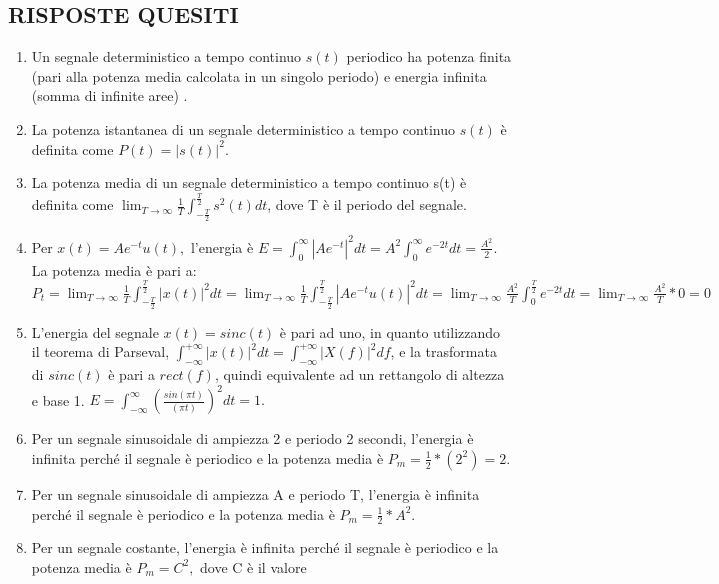 \documentclass[12pt
]{article}
\begin{document}
\hypertarget{risposte-quesiti}{%
	\subsection{RISPOSTE QUESITI}\label{risposte-quesiti}}

\begin{enumerate}
	\def\labelenumi{\arabic{enumi}.} 
	\item
	Un segnale deterministico a tempo continuo \(s(t)\) periodico ha
	potenza finita (pari alla potenza media calcolata in un singolo periodo) e energia infinita (somma di infinite aree) .
	\item
	La potenza istantanea di un segnale deterministico a tempo continuo
	\(s(t)\) è definita come \(P(t) = |s(t)|^2\).
	\item
	La potenza media di un segnale deterministico a tempo continuo s(t) è
	definita come $ \displaystyle \lim_{T\to\infty} \frac{1}{T} \int_{-\frac{T}{2}}^{\frac{T}{2}} s^2(t) dt$, dove T è il periodo del segnale.
	\item
	Per $\displaystyle x(t) = Ae^{-t}u(t),$ l'energia è $ \displaystyle E = \int_0^\infty |Ae^{-t}|^2 dt = A^2 \int_0^\infty e^{-
		2t} dt = \frac{A^2}{2}$.
	\newline
		La potenza media è pari a: $\displaystyle P_t = \lim_{T \to \infty} \frac{1}{T} \int_{-\frac{T}{2}}^{\frac{T}{2}} |x(t)|^2 dt = \lim_{T \to \infty} \frac{1}{T} \int_{-\frac{T}{2}}^{\frac{T}{2}} |A e^{-t} u(t)|^2 dt =  \lim_{T \to \infty} \frac{A^2}{T} \int_{0}^{\frac{T}{2}} e^{-2t} dt = \lim_{T \to \infty} \frac{A^2}{T}*0 = 0$
	\item
	L'energia del segnale \(x(t) = sinc(t)\) è pari ad uno, in quanto utilizzando il teorema di Parseval,
	$ \displaystyle\int_{-\infty}^{+\infty}|x(t)|^2dt = \int_{-\infty}^{+\infty}|X(f)|^2df$, e la trasformata 
	di $sinc(t)$ è pari a $rect(f)$, quindi equivalente ad un rettangolo di altezza e base 1.
	$ \displaystyle E = \int_{-\infty}^\infty (\frac{sin(\pi t)}{( \pi t)})^2 dt = 1.$
	\item
	Per un segnale sinusoidale di ampiezza 2 e periodo 2 secondi,
	l'energia è infinita perché il segnale è periodico e la potenza media
	è \(P_m = \frac{1}{2} * (2^2) = 2.\)
	\item
	Per un segnale sinusoidale di ampiezza A e periodo T, l'energia è
	infinita perché il segnale è periodico e la potenza media è
	\(P_m = \frac{1}{2} * A^2\).
	\item
	Per un segnale costante, l'energia è infinita perché il segnale è
	periodico e la potenza media è \(P_m = C^2,\) dove C è il valore

\end{enumerate}
\end{document}
